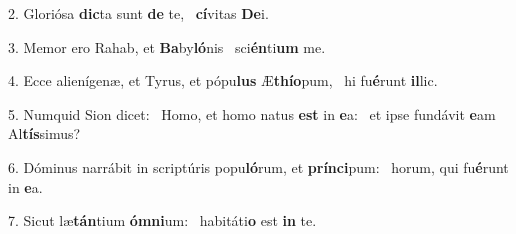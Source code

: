 2. Gloriósa \textbf{dic}ta sunt \textbf{de} te, \ast\  \textbf{cí}vitas \textbf{De}i.\

3. Memor ero Rahab, et \textbf{Ba}by\textbf{ló}nis \ast\  sci\textbf{én}ti\textbf{um} me.\

4. Ecce alienígenæ, et Tyrus, et pópu\textbf{lus} Æ\textbf{thí}\textbf{o}pum, \ast\  hi fu\textbf{é}runt \textbf{il}lic.\

5. Numquid Sion dicet: \dag\  Homo, et homo natus \textbf{est} in \textbf{e}a: \ast\  et ipse fundávit \textbf{e}am Al\textbf{tís}simus?\

6. Dóminus narrábit in scriptúris popu\textbf{ló}rum, et \textbf{prín}\textbf{ci}pum: \ast\  horum, qui fu\textbf{é}runt in \textbf{e}a.\

7. Sicut læ\textbf{tán}tium \textbf{óm}\textbf{ni}um: \ast\  habitáti\textbf{o} est \textbf{in} te.\

